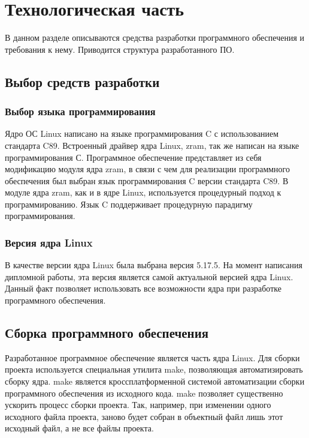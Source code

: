 \section{Технологическая часть}

В данном разделе описываются средства разработки программного обеспечения и требования к нему. Приводится структура разрабо­танного ПО.

\subsection{Выбор средств разработки}

\subsubsection{Выбор языка программирования}

Ядро ОС Linux написано на языке программирования C с использованием стандарта C89. Встроенный драйвер ядра Linux, zram, так же написан на языке программирования С. Программное обеспечение представляет из себя модификацию модуля ядра zram, в связи с чем для реализации программного обеспечения был выбран язык программирования C версии стандарта C89. В модуле ядра zram, как и в ядре Linux, используется процедурный подход к программированию. Язык C поддерживает процедурную парадигму программирования.

\subsubsection{Версия ядра Linux}

В качестве версии ядра Linux была выбрана версия 5.17.5. На момент написания дипломной работы, эта версия является самой актуальной версией ядра Linux. Данный факт позволяет использовать все возможности ядра при разработке программного обеспечения. 

\subsection{Сборка программного обеспечения}

Разработанное программное обеспечение является часть ядра Linux. Для сборки проекта используется специальная утилита make, позволяющая автоматизировать сборку ядра. make является кроссплатформенной системой автоматизации сборки программного обеспечения из исходного кода. make позволяет существенно ускорить процесс сборки проекта. Так, например, при изменении одного исходного файла проекта, заново будет собран в объектный файл лишь этот исходный файл, а не все файлы проекта.

